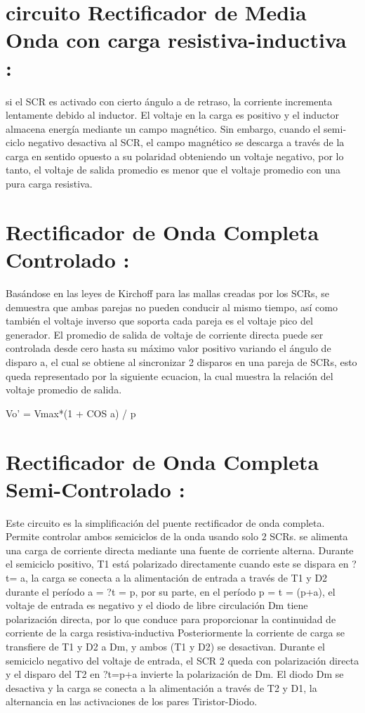 \documentclass[11pt,a4paper]{article}
\begin{document}
\section{circuito Rectificador de Media Onda con carga resistiva-inductiva :}
si el SCR es activado con cierto ángulo a de retraso, la corriente incrementa lentamente debido al inductor. El voltaje en la carga es positivo y el inductor almacena energía mediante un campo magnético. Sin embargo, cuando el semi-ciclo negativo desactiva al SCR, el campo magnético se descarga a través de la carga en sentido opuesto a su polaridad obteniendo un voltaje negativo, por lo tanto, el voltaje de salida promedio es menor que el voltaje promedio con una pura carga resistiva.
\section{Rectificador de Onda Completa Controlado :}
Basándose en las leyes de Kirchoff para las mallas creadas por los SCRs, se demuestra que ambas parejas no pueden conducir al mismo tiempo, así como también el voltaje
inverso que soporta cada pareja es el voltaje pico del generador. El promedio de salida de voltaje de corriente directa puede ser controlada desde cero hasta su máximo valor positivo variando el ángulo de disparo a, el cual se obtiene al sincronizar 2 disparos en una pareja de SCRs, esto queda representado por la siguiente ecuacion, la cual muestra la relación del voltaje promedio de salida.
\begin{center}
Vo' = Vmax*(1 + COS a) / p\\
\end{center}
\section{Rectificador de Onda Completa Semi-Controlado :}
Este circuito es la simplificación del puente rectificador de onda completa. Permite controlar ambos semiciclos de la onda usando solo 2 SCRs. se alimenta una carga de corriente directa mediante una fuente de corriente alterna.
Durante el semiciclo positivo, T1 está polarizado directamente cuando este se dispara en ?t= a, la carga se conecta a la alimentación de entrada a través de T1 y D2 durante el período a = ?t = p, por su parte, en el período p = t = (p+a), el voltaje de entrada es negativo y el diodo de libre circulación Dm tiene polarización directa, por lo que conduce para proporcionar la continuidad de corriente de la carga resistiva-inductiva Posteriormente la corriente de carga se transfiere de T1 y D2 a Dm, y ambos (T1 y D2) se desactivan. Durante el semiciclo negativo del voltaje de entrada, el SCR 2 queda con polarización directa y el disparo del T2 en ?t=p+a invierte la polarización de Dm. El diodo Dm se desactiva y la carga se conecta a la alimentación a través de T2 y D1, la alternancia en las activaciones de los pares Tiristor-Diodo.
\end{document}
